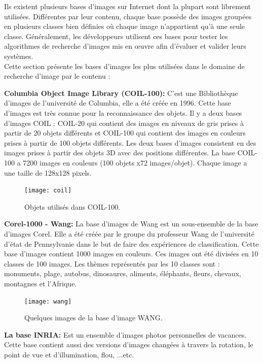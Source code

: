 Ils existent plusieurs bases d’images sur Internet dont la plupart sont librement utilisées. Différentes par leur contenu, chaque base possède des images groupées en plusieurs classes bien définies où chaque image  n’appartient qu’à une seule classe. Généralement, les développeurs utilisent ces bases pour tester les algorithmes de recherche d’images mis en œuvre afin d’évaluer et valider leurs systèmes.\\

Cette section présente les bases d’images les plus utilisées dans le domaine de recherche d’image par le contenu :


\textbf{Columbia Object Image Library (COIL-100):}
C’est une Bibliothèque d’images de l’université de Columbia, elle a été créée en 1996. Cette base d’images est très connue pour la reconnaissance des objets. Il y a deux bases d’images COIL : COIL-20 qui contient des images en niveaux de gris prises à partir de 20 objets différents et COIL-100 qui contient des images en couleurs prises à partir de 100 objets différents. Les deux bases d’images consistent en des images prises à partir des objets 3D avec des positions différentes. La base COIL-100 a 7200 images en couleurs (100 objets x72 images/objet). Chaque image a une taille de 128x128 pixels.

\begin{figure}[H]
	\centering
	\texttt{[image: coil]} 
	\caption{Objets utilisés dans COIL-100.}
\end{figure}

\textbf{Corel-1000 - Wang:}
La base d’images de Wang est un sous-ensemble de la base d’images
Corel. Elle a été créée par le groupe du professeur Wang de l'université d'état de Pennsylvanie dans le but de faire des expériences de classification.
Cette base d’images contient 1000 images en couleurs. Ces images ont été divisées en 10 classes de 100 images. Les thèmes représentés par les 10 classes sont : monuments, plage, autobus, dinosaures, aliments, éléphants, fleurs, chevaux, montagnes et l’Afrique.

\begin{figure}[H]
	\centering
	\texttt{[image: wang]} 
	\caption{Quelques images de la base d’image WANG.}
\end{figure}

\textbf{La base INRIA:}
Est un ensemble d’images photos personnelles de vacances. Cette base contient aussi des versions d’images changées à travers la rotation, le point de vue et d’illumination, flou, ...etc.

